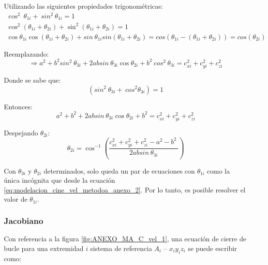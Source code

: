         Utilizando las siguientes propiedades trigonométricas:
        \begin{gather*}
            \cos^{2}~ \theta _{1i}+~sin^{2}~ \theta _{1i}=1\\
            \cos^{2}  \left(  \theta _{1i}+ \theta _{2i} \right)+\sin ^{2} \left(  \theta _{1i}+ \theta _{2i} \right) =1 \\
            \cos \theta _{1i}\cos  \left(  \theta _{1i}+ \theta _{2i} \right) +sin~ \theta _{1i}sin \left(  \theta _{1i}+ \theta _{2i} \right) =cos⁡  \left(  \theta _{1i}- \left(  \theta _{1i}+ \theta _{2i} \right)  \right) = cos⁡  \left(  \theta _{2i} \right)
        \end{gather*}

        Reemplazando:
        \begin{equation*}
         \Longrightarrow a^{2}+b^{2}sin^{2} ~ \theta _{3i}+ 2 ab sin~ \theta _{3i}\cos  \theta _{2i}+b^{2}~cos^{2} ~ \theta _{3i}= c_{xi}^{2}+c_{yi}^{2}+c_{zi}^{2} 
        \end{equation*}
        
        Donde se sabe que:
        \begin{equation*}
            \left( sin^{2}~ \theta _{3i}+~cos^{2} \theta _{3i} \right) =1
        \end{equation*}
        
        Entonces:
        \begin{equation*}
            a^{2}+b^{2}+ 2 ab sin~ \theta _{3i}\cos  \theta _{2i}+b^{2}= c_{xi}^{2}+c_{yi}^{2}+c_{zi}^{2}
        \end{equation*}
        
        Despejando  $\theta _{2i}$:
                \vspace{-0.2em}
        \begin{equation}
          \theta _{2i}=\cos ^{-1} \left( \frac{c_{xi}^{2}+c_{yi}^{2}+c_{zi}^{2}- a^{2}-b^{2}~}{2 ab sin~ \theta _{3i}} \right) 
        \end{equation}
        
        Con  $\theta _{3i}$  y  $\theta _{2i}$  determinados, solo queda un par de ecuaciones con $\theta _{1i}$  como la única incógnita que desde la ecuación \ref{eq:modelacion_cine_vel_metodoa_anexo_2}. Por lo tanto, es posible resolver el valor de $ \theta _{1i}$.

\newpage


        \subsubsection{Jacobiano}
            Con referencia a la figura \ref{fig:ANEXO_MA_C_vel_1}, una ecuación de cierre de bucle para una extremidad $i$ sistema de referencia $A_{i}$ – $ x_{i}y_{i}z_{i}$  se puede escribir como:
            
